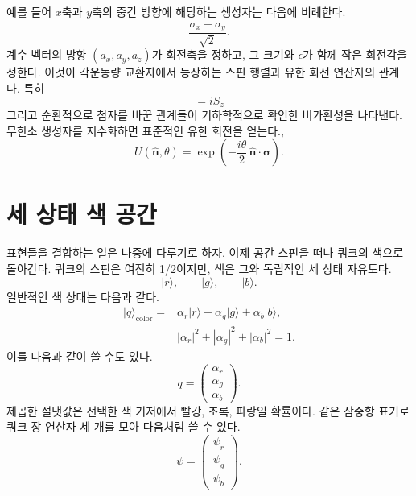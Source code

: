 예를 들어 \(x\)축과 \(y\)축의 중간 방향에 해당하는 생성자는 다음에 비례한다.
\begin{equation}
\frac{\sigma_x+\sigma_y}{\sqrt2}.
\end{equation}
계수 벡터의 방향 \((a_x,a_y,a_z)\)가 회전축을 정하고, 그 크기와 \(\epsilon\)가 함께 작은 회전각을 정한다. 이것이 각운동량 교환자에서 등장하는 스핀 행렬과 유한 회전 연산자의 관계다. 특히
\begin{equation}
[S_x,S_y]=iS_z
\end{equation}
그리고 순환적으로 첨자를 바꾼 관계들이 기하학적으로 확인한 비가환성을 나타낸다. 무한소 생성자를 지수화하면 표준적인 유한 회전을 얻는다.,
\begin{equation}
U(\hat{\boldsymbol n},\theta)
=\exp\left(-\frac{i\theta}{2}\,
\hat{\boldsymbol n}\cdot\boldsymbol\sigma\right).
\end{equation}
\section{세 상태 색 공간}

표현들을 결합하는 일은 나중에 다루기로 하자. 이제 공간 스핀을 떠나 쿼크의 색으로 돌아간다. 쿼크의 스핀은 여전히 1/2이지만, 색은 그와 독립적인 세 상태 자유도다.
\begin{equation}
\lvert r\rangle,\qquad
\lvert g\rangle,\qquad
\lvert b\rangle.
\end{equation}
일반적인 색 상태는 다음과 같다.
\begin{equation}
\begin{aligned}
\lvert q\rangle_{\mathrm{color}}
={}&
\alpha_r\lvert r\rangle
+\alpha_g\lvert g\rangle
+\alpha_b\lvert b\rangle,
\\
&|\alpha_r|^2+|\alpha_g|^2+|\alpha_b|^2=1.
\end{aligned}
\end{equation}
이를 다음과 같이 쓸 수도 있다.
\begin{equation}
q=
\begin{pmatrix}
\alpha_r\\
\alpha_g\\
\alpha_b
\end{pmatrix}.
\end{equation}
제곱한 절댓값은 선택한 색 기저에서 빨강, 초록, 파랑일 확률이다. 같은 삼중항 표기로 쿼크 장 연산자 세 개를 모아 다음처럼 쓸 수 있다.
\begin{equation}
\psi=
\begin{pmatrix}
\psi_r\\
\psi_g\\
\psi_b
\end{pmatrix}.
\end{equation}

